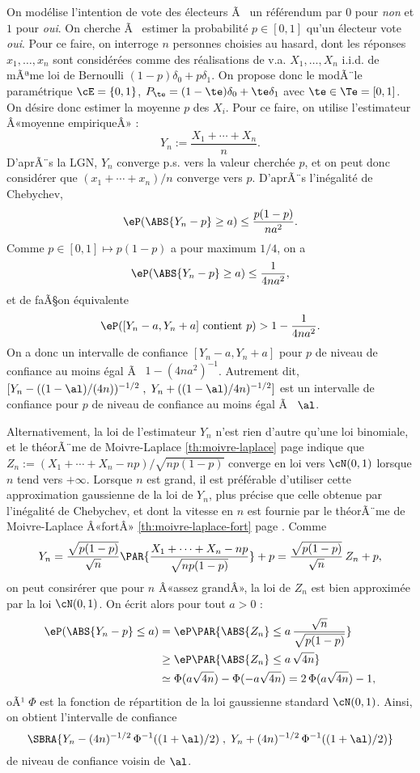 On modélise l'intention de vote des électeurs Ã  un référendum par $0$ pour
\emph{non} et $1$ pour \emph{oui}. On cherche Ã  estimer la probabilité
$p\in[0,1]$ qu'un électeur vote \emph{oui}. Pour ce faire, on interroge $n$
personnes choisies au hasard, dont les réponses $x_1,\ldots,x_n$ sont
considérées comme des réalisations de v.a. $X_1,\ldots,X_n$ i.i.d. de mÃªme loi
de Bernoulli $(1-p)\delta_0+p\delta_1$. On propose donc le modÃ¨le paramétrique
$\cE=\{0,1\}$, $P_\te=(1-\te)\delta_0+\te\delta_1$ avec $\te\in\Te=[0,1]$. On désire
donc estimer la moyenne $p$ des $X_i$. Pour ce faire, on utilise l'estimateur
Â«moyenne empiriqueÂ» :
$$
Y_n:=\frac{X_1+\cdots+X_n}{n}.
$$
D'aprÃ¨s la LGN, $Y_n$ converge p.s. vers la valeur cherchée $p$, et on peut
donc considérer que $(x_1+\cdots+x_n)/n$ converge vers $p$.  D'aprÃ¨s
l'inégalité de Chebychev,
$$
\eP(\ABS{Y_n-p} \geq a) \leq \frac{p(1-p)}{na^2}.
$$
Comme $p\in[0,1]\mapsto p(1-p)$ a pour maximum
$1/4$, on a
$$
\eP(\ABS{Y_n-p} \geq a) \leq \frac{1}{4na^2},
$$
et de faÃ§on équivalente
$$
\eP([Y_n-a,Y_n+a] \text{ contient } p) > 1-\frac{1}{4na^2}.
$$
On a donc un intervalle de confiance $[Y_n-a,Y_n+a]$ pour $p$ de niveau de
confiance au moins égal Ã  $1-(4na^2)^{-1}$. Autrement dit,
$[Y_n-((1-\al)/(4n))^{-1/2}\;,\;Y_n+((1-\al)/4n)^{-1/2}]$ est un intervalle de
confiance pour $p$ de niveau de confiance au moins égal Ã  $\al$.

Alternativement, la loi de l'estimateur $Y_n$ n'est rien d'autre qu'une loi
binomiale, et le théorÃ¨me de Moivre-Laplace \ref{th:moivre-laplace} page
\pageref{th:moivre-laplace} indique que
$Z_n:=(X_1+\cdots+X_n-np)/\sqrt{np(1-p)}$ converge en loi vers $\cN(0,1)$
lorsque $n$ tend vers $+\infty$. Lorsque $n$ est grand, il est préférable
d'utiliser cette approximation gaussienne de la loi de $Y_n$, plus précise que
celle obtenue par l'inégalité de Chebychev, et dont la vitesse en $n$ est
fournie par le théorÃ¨me de Moivre-Laplace Â«fortÂ» \ref{th:moivre-laplace-fort}
page \pageref{th:moivre-laplace-fort}. Comme
$$
Y_n=\frac{\sqrt{p(1-p)}}{\sqrt{n}}\PAR{\frac{X_1+\cdots+X_n-np}{\sqrt{np(1-p)}}}+p
=\frac{\sqrt{p(1-p)}}{\sqrt{n}}\,Z_n+p,
$$
on peut consirérer que pour $n$ Â«assez grandÂ», la loi de $Z_n$ est bien
approximée par la loi $\cN(0,1)$. On écrit alors pour tout $a>0$ :
\begin{align*}
  \eP(\ABS{Y_n-p} \leq a) 
  &= \eP\PAR{\ABS{Z_n} \leq a\,\frac{\sqrt{n}}{\sqrt{p(1-p)}}}\\
  &\geq \eP\PAR{\ABS{Z_n} \leq a\,\sqrt{4n}} \\
  &\simeq \Phi(a\sqrt{4n})-\Phi(-a\sqrt{4n}) = 2\,\Phi(a\sqrt{4n})-1,
\end{align*}
oÃ¹ $\Phi$ est la fonction de répartition de la loi gaussienne standard
$\cN(0,1)$. Ainsi, on obtient l'intervalle de confiance
$$
\SBRA{Y_n-(4n)^{-1/2}\,\Phi^{-1}((1+\al)/2)\;,\;Y_n+(4n)^{-1/2}\,\Phi^{-1}((1+\al)/2)}
$$
de niveau de confiance voisin de $\al$.


